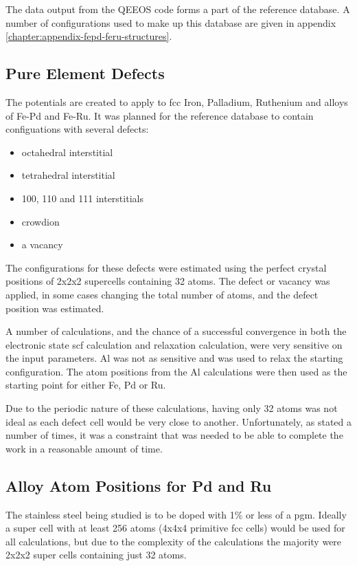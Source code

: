 The data output from the QEEOS code forms a part of the reference database.  A number of configurations used to make up this database are given in appendix \ref{chapter:appendix-fepd-feru-structures}.





\subsection{Pure Element Defects}

The potentials are created to apply to \acrshort{fcc} Iron, Palladium, Ruthenium and alloys of Fe-Pd and Fe-Ru.  It was planned for the reference database to contain configuations with several defects:

\begin{itemize}
\item octahedral interstitial
\item tetrahedral interstitial
\item 100, 110 and 111 interstitials
\item crowdion
\item a vacancy
\end{itemize}

The configurations for these defects were estimated using the perfect crystal positions of 2x2x2 supercells containing 32 atoms.  The defect or vacancy was applied, in some cases changing the total number of atoms, and the defect position was estimated.

A number of calculations, and the chance of a successful convergence in both the electronic state \acrshort{scf} calculation and relaxation calculation, were very sensitive on the input parameters.  \Gls{Al} was not as sensitive and was used to relax the starting configuration.  The atom positions from the \Gls{Al} calculations were then used as the starting point for either Fe, Pd or Ru.

Due to the periodic nature of these calculations, having only 32 atoms was not ideal as each defect cell would be very close to another.  Unfortunately, as stated a number of times, it was a constraint that was needed to be able to complete the work in a reasonable amount of time.

\FloatBarrier
\subsection{Alloy Atom Positions for Pd and Ru}

The stainless steel being studied is to be doped with 1\% or less of a \acrlong{pgm}.  Ideally a super cell with at least 256 atoms (4x4x4 primitive \acrshort{fcc} cells) would be used for all calculations, but due to the complexity of the calculations the majority were 2x2x2 super cells containing just 32 atoms.

